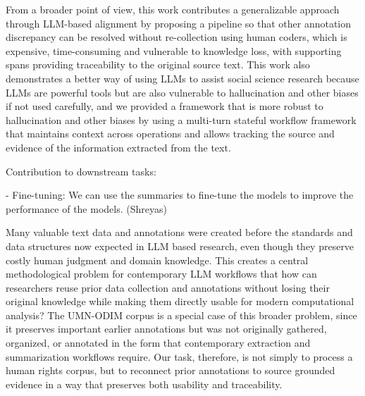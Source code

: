 \documentclass{article}
\begin{document}

From a broader point of view, this work contributes a generalizable approach through LLM-based alignment by proposing a pipeline so that other annotation discrepancy can be resolved without re-collection using human coders, which is expensive, time-consuming and vulnerable to knowledge loss, with supporting spans providing traceability to the original source text. This work also demonstrates a better way of using LLMs to assist social science research because LLMs are powerful tools but are also vulnerable to hallucination and other biases if not used carefully, and we provided a framework that is more robust to hallucination and other biases by using a multi-turn stateful workflow framework that maintains context across operations and allows tracking the source and evidence of the information extracted from the text.

\medskip

Contribution to downstream tasks: 

- Fine-tuning: We can use the
summaries to fine-tune the models to improve the performance of the
models. (Shreyas)

\medskip

Many valuable text data and annotations were created before the standards and data structures now expected in LLM based research, even though they preserve costly human judgment and domain knowledge. This creates a central methodological problem for contemporary LLM workflows that how can researchers reuse prior data collection and annotations without losing their original knowledge while making them directly usable for modern computational analysis? The UMN-ODIM corpus is a special case of this broader problem, since it preserves important earlier annotations but was not originally gathered, organized, or annotated in the form that contemporary extraction and summarization workflows require. Our task, therefore, is not simply to process a human rights corpus, but to reconnect prior annotations to source grounded evidence in a way that preserves both usability and traceability.


\end{document}
